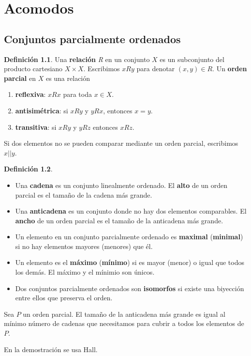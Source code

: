 \documentclass[spanish]{book}
\theoremstyle{definition}
\newtheorem*{defn}{Definición}
\begin{document}
\part{Acomodos}
\chapter{Conjuntos parcialmente ordenados}
\begin{defn}
	Una \textbf{relación} \textit{R} en un conjunto $X$ es un subconjunto del producto cartesiano $X\times X$. Escribimos $xRy$ para denotar $(x,y)\in R$. Un \textbf{orden parcial} en $X$ es una relación
	\begin{enumerate}
		\item[] \textbf{reflexiva}: $xRx$ para toda $x\in X$.
		\item[] \textbf{antisimétrica}: si  $xRy$ y $yRx$, entonces $x=y$.
		\item[] \textbf{transitiva}: si $xRy$ y $yRz$ entonces $xRz$.
	\end{enumerate}
	Si dos elementos no se pueden comparar mediante un orden parcial, escribimos $x||y$.
\end{defn}
\begin{defn}\leavevmode
	\begin{itemize}
		\item 	Una \textbf{cadena} es un conjunto linealmente ordenado. El \textbf{alto} de un orden parcial es el tamaño de la cadena más grande.
		\item Una \textbf{anticadena} es un conjunto donde no hay dos elementos comparables. El \textbf{ancho} de un orden parcial es el tamaño de la anticadena más grande.
		\item Un elemento en un conjunto parcialmente ordenado es \textbf{maximal} (\textbf{minimal}) si no hay elementos mayores (menores) que él.
		\item Un elemento es el \textbf{máximo} (\textbf{mínimo}) si es mayor (menor) o igual que todos los demás. El máximo y el mínimio son únicos.
		\item Dos conjuntos parcialmente ordenados son \textbf{isomorfos} si existe una biyección entre ellos que preserva el orden.
	\end{itemize}
\end{defn}
\begin{teo}[Dilworth, 1950]
	Sea $P$ un orden parcial. El tamaño de la anticadena más grande es igual al mínimo número de cadenas que necesitamos para cubrir a todos los elementos de $P$.
\end{teo}
En la demostración se usa Hall.
\end{document}
